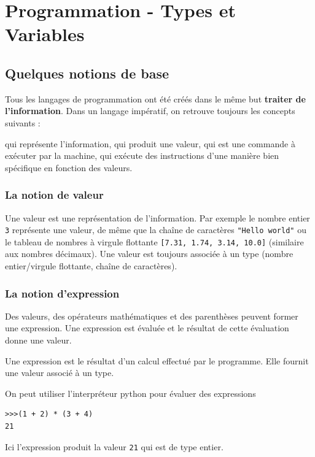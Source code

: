 \documentclass[11pt, a4paper]{book}
\begin{document}
\setcounter{chapter}{6}

\chapter{Programmation - Types et Variables}


\section{Quelques notions de base}

Tous les langages de programmation ont été créés dans le même but \textbf{traiter de l'information}. Dans un langage impératif, on retrouve toujours les concepts suivants : 
\begin{itemize}
	 qui représente l'information,
	 qui produit une valeur,
	 qui est une commande à exécuter par la machine,
	 qui exécute des instructions d'une manière bien spécifique en fonction des valeurs.
\end{itemize}

\subsection{La notion de valeur}
Une valeur est une représentation de l'information. Par exemple le nombre entier \lstinline{3} représente une valeur, de même que la chaîne de caractères \lstinline{"Hello world"} ou le tableau de nombres à virgule flottante \lstinline{[7.31, 1.74, 3.14, 10.0]}  (similaire aux nombres décimaux). Une valeur est toujours associée à un type (nombre entier/virgule flottante, chaîne de caractères).\\

\subsection{La notion d'expression}
Des valeurs, des opérateurs mathématiques et des parenthèses peuvent former une expression. Une expression est évaluée et le résultat de cette évaluation donne une valeur. 
\begin{mydefinition}
	Une expression est le résultat d'un calcul effectué par le programme. Elle fournit une valeur associé à un type.
\end{mydefinition}

On peut utiliser l'interpréteur python pour évaluer des expressions
\begin{myexample}
	\begin{lstlisting}[numbers=none]
>>>(1 + 2) * (3 + 4)
21
	\end{lstlisting}
	Ici l'expression produit la valeur \lstinline{21} qui est de type entier.
\end{myexample}
\end{document}
